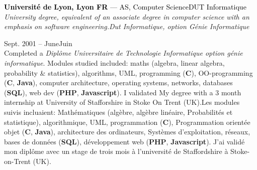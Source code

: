\documentclass[a4paper]{article}
\newcommand\enfr[2]{\ifdefined\doen#1\else#2\fi\xspace}
\newcommand\cpplang{\textbf{C\raisebox{0.1em}{++}}\xspace}
\newcommand\php{\textbf{PHP}\xspace}
\newcommand\js{\textbf{Javascript}\xspace}
\newcommand\sql{\textbf{SQL}\xspace}
\newcommand\clang{\textbf{C}\xspace}
\newcommand\java{\textbf{Java}\xspace}
\newcommand\entry[2]{\large\textcolor{Black}{\textbf{#1} --- #2}\normalsize}
\newcommand\timespan[2]{\normalsize\textsf{#1 -- #2}}
\begin{document}
\begin{minipage}[t]{0.63\textwidth}
\entry{Université de Lyon, Lyon\enfr{ FR}{}}{\enfr{AS, Computer Science}{DUT Informatique}}\\
\textit{\enfr{University degree, equivalent of an associate degree in computer science with an
emphasis on software engineering.}{Dut Informatique, option Génie Informatique}}

\vspace{0.5em}
\timespan{Sept. 2001}{\enfr{June}{Juin} 2003}\\
\enfr{
Completed a \textit{Diplôme Universitaire de Technologie Informatique
  option génie informatique}. Modules studied included: maths
(algebra, linear algebra, probability \& statistics), algorithms, UML,
programming (\clang), OO-programming (\cpplang, \java), computer
architecture, operating systems, networks, databases (\sql), web dev
(\php, \js). I validated My degree with a 3 month internship at
University of Stafforshire in Stoke On Trent (UK).}
  {Les modules suivis incluaient: Mathématiques (algèbre, algèbre
    linéaire, Probabilités et statistique), algorithmique, UML,
    programmation (\clang), Programmation orientée objet (\cpplang,
    \java), architecture des ordinateurs, Systèmes d'exploitation,
    réseaux, bases de données (\sql), développement web (\php,
    \js). J'ai validé mon diplôme avec un stage de trois mois à
    l'université de Staffordshire à Stoke-on-Trent (UK).}

\end{minipage}
\hfill
\end{document}
